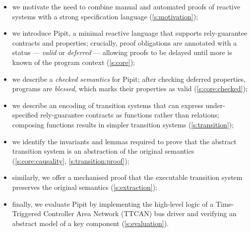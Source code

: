 \begin{itemize}
  \item we motivate the need to combine manual and automated proofs of reactive systems with a strong specification language (\autoref{s:motivation});
  \item we introduce Pipit, a minimal reactive language that supports rely-guarantee contracts and properties; crucially, proof obligations are annotated with a status --- \emph{valid} or \emph{deferred} --- allowing proofs to be delayed until more is known of the program context (\autoref{s:core});
  \item we describe a \emph{checked semantics} for Pipit; after checking deferred properties, programs are \emph{blessed}, which marks their properties as valid (\autoref{s:core:checked});
  \item we describe an encoding of transition systems that can express under-specified rely-guarantee contracts as functions rather than relations; composing functions results in simpler transition systems (\autoref{s:transition});
  \item we identify the invariants and lemmas required to prove that the abstract transition system is an abstraction of the original semantics (\autoref{s:core:causality}, \autoref{s:transition:proof});
  \item similarly, we offer a mechanised proof that the executable transition system preserves the original semantics (\autoref{s:extraction});
  \item finally, we evaluate Pipit by implementing the high-level logic of a Time-Triggered Controller Area Network (TTCAN) bus driver and verifying an abstract model of a key component (\autoref{s:evaluation}).
\end{itemize}
